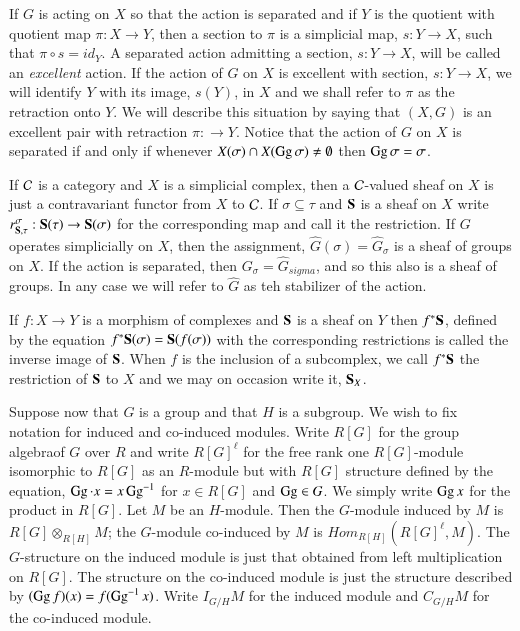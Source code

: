 If $G$ is acting on $X$ so that the action is separated and if $Y$ is the quotient with quotient map $\pi : X\rightarrow Y$, then a section to $\pi$ is a simplicial map, $s: Y \rightarrow X$, such that $\pi \circ s = id_{Y}$. A separated action admitting a section, $s : Y \rightarrow X$, will be called an \textit{excellent} action. If the action of $G$ on $X$ is excellent with section, $s: Y\rightarrow X$, we will identify $Y$ with its image, $s(Y)$, in $X$ and we shall refer to $\pi$ as the retraction onto $Y$. We will describe this situation by saying that $(X, G)$ is an excellent pair with retraction $\pi : \rightarrow Y$. Notice that the action of $G$ on $X$ is separated if and only if whenever $X(\sigma) \cap X(\operatorname{Gg}\sigma)\neq \emptyset$ then $\operatorname{Gg}\sigma = \sigma$.

If $\mathcal{C}$ is a category and $X$ is a simplicial complex, then a $\mathcal{C}$-valued sheaf on $X$ is just a contravariant functor from $X$ to $\mathcal{C}$. If $\sigma \subseteq \tau$ and $\mathbf{S}$ is a sheaf on $X$ write $r_{\mathbf{S}, \tau}^{\sigma} : \mathbf{S}(\tau) \rightarrow \mathbf{S}(\sigma)$ for the corresponding map and call it the restriction. If $G$ operates simplicially on $X$, then the assignment, $\hat{G}(\sigma) = \hat{G}_{\sigma}$ is a sheaf of groups on $X$. If the action is separated, then $G_{\sigma} = \hat{G}_{sigma}$, and so this also is a sheaf of groups. In any case we will refer to $\hat{G}$ as teh stabilizer of the action.

If $f : X \rightarrow Y$ is a morphism of complexes and $\mathbf{S}$ is a sheaf on $Y$ then $f^{*}\mathbf{S}$, defined by the equation $f^{*}\mathbf{S}(\sigma) = \mathbf{S}(f(\sigma))$ with the corresponding restrictions is called the inverse image of $\mathbf{S}$. When $f$ is the inclusion of a subcomplex, we call $f^{*}\mathbf{S}$ the restriction of $\mathbf{S}$ to $X$ and we may on occasion write it, $\mathbf{S}_{X}$.

Suppose now that $G$ is a group and that $H$ is a subgroup. We wish to fix notation for induced and co-induced modules. Write $R[G]$ for the group algebra\pageoriginale of $G$ over $R$ and write $R[G]^{\ell}$ for the free rank one $R[G]$-module isomorphic to $R[G]$  as an $R$-module but with $R[G]$ structure defined by the equation, $\operatorname{Gg} \cdot x = x\operatorname{Gg}^{-1}$ for $x \in R[G]$ and $\operatorname{Gg} \in G$. We simply write $\operatorname{Gg} x$ for the product in $R[G]$. Let $M$ be an $H$-module. Then the $G$-module induced by $M$ is $R[G] \otimes_{R[H]}M$; the $G$-module co-induced by $M$ is $Hom_{R[H]}(R[G]^{\ell}, M)$. The $G$-structure on the induced module is just that obtained from left multiplication on $R[G]$. The structure on the co-induced module is just the structure described by $(\operatorname{Gg} f)(x)= f(\operatorname{Gg}^{-1} x)$. Write $I_{G/H}M$ for the induced module and $C_{G/H}M$ for the co-induced module.

